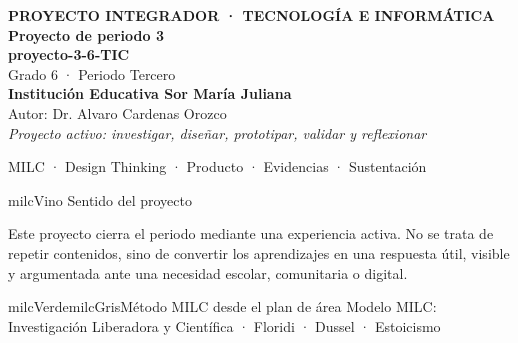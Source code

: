 \documentclass[11pt,letterpaper]{article}
\begin{document}
\thispagestyle{empty}

\vspace*{.85cm}
\begin{tcolorbox}[
  enhanced,colback=milcVino,colframe=milcVino,arc=12mm,width=.86\textwidth,
  boxrule=0pt,left=12mm,right=12mm,top=11mm,bottom=11mm,center,
  overlay={\draw[milcMagenta,line width=2pt,dash pattern=on 9pt off 8pt,rounded corners=10mm]
  ([xshift=7mm,yshift=-7mm]frame.north west) rectangle ([xshift=-7mm,yshift=7mm]frame.south east);}]
  \centering
  {\sffamily\bfseries\color{white}\fontsize{15}{17}\selectfont PROYECTO INTEGRADOR · TECNOLOGÍA E INFORMÁTICA}\\[1.0cm]
  {\sffamily\bfseries\color{white}\fontsize{30}{33}\selectfont Proyecto de periodo 3}\\[3mm]
  {\sffamily\bfseries\color{milcMostaza}\fontsize{25}{28}\selectfont proyecto-3-6-TIC}\\[8mm]
  {\sffamily\color{white}\Large Grado 6 · Periodo Tercero}\\[1.0cm]
  {\sffamily\bfseries\color{white}\large Institución Educativa Sor María Juliana}\\[2mm]
  {\sffamily\color{white}Autor: Dr. Alvaro Cardenas Orozco}\\[4mm]
  {\sffamily\itshape\color{white}Proyecto activo: investigar, diseñar, prototipar, validar y reflexionar}
\end{tcolorbox}
\vfill
\begin{tcolorbox}[enhanced,colback=milcVino!72!black,colframe=milcVino!72!black,arc=5mm,boxrule=0pt,width=.86\textwidth,left=6mm,right=6mm,top=4mm,bottom=4mm,center]
{\color{white}\sffamily\small MILC · Design Thinking · Producto · Evidencias · Sustentación}
\end{tcolorbox}

\newpage
\begin{titlebox}{milcVino}
Sentido del proyecto
\end{titlebox}
\begin{multicols}{2}
Este proyecto cierra el periodo mediante una experiencia activa. No se trata de repetir contenidos, sino de convertir los aprendizajes en una respuesta útil, visible y argumentada ante una necesidad escolar, comunitaria o digital.

\columnbreak
\begin{softbox}{milcVerde}{milcGris}{Método MILC desde el plan de área}
Modelo MILC: Investigación Liberadora y Científica · Floridi · Dussel · Estoicismo
\end{softbox}
\end{multicols}
\end{document}
